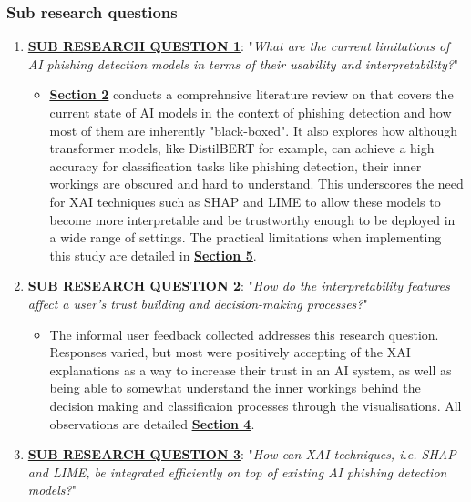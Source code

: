 
\subsubsection*{Sub research questions}

\begin{enumerate}
  \item \uline{\textbf{SUB RESEARCH QUESTION 1}}: "\textit{What are the current limitations of AI phishing detection models in terms of their usability and interpretability?}"
  \begin{itemize}
    \item \hyperref[sec:2-literature-review]{\uline{\textbf{Section 2}}} conducts a comprehnsive literature review on that covers the current state of AI models in the context of phishing detection and how most of them are inherently "black-boxed". It also explores how although transformer models, like DistilBERT for example, can achieve a high accuracy for classification tasks like phishing detection, their inner workings are obscured and hard to understand. This underscores the need for XAI techniques such as SHAP and LIME to allow these models to become more interpretable and be trustworthy enough to be deployed in a wide range of settings. The practical limitations when implementing this study are detailed in \hyperref[sec:5-discussion]{\uline{\textbf{Section 5}}}.
  \end{itemize}
  \item \uline{\textbf{SUB RESEARCH QUESTION 2}}: "\textit{How do the interpretability features affect a user's trust building and decision-making processes?}"
  \begin{itemize}
    \item The informal user feedback collected addresses this research question. Responses varied, but most were positively accepting of the XAI explanations as a way to increase their trust in an AI system, as well as being able to somewhat understand the inner workings behind the decision making and classificaion processes through the visualisations. All observations are detailed \hyperref[sec:4-results]{\uline{\textbf{Section 4}}}.
  \end{itemize}
  \item \uline{\textbf{SUB RESEARCH QUESTION 3}}: "\textit{How can XAI techniques, i.e. SHAP and LIME, be integrated efficiently on top of existing AI phishing detection models?}"

\end{enumerate}
